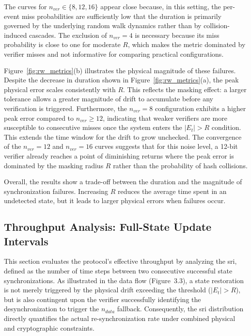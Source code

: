 The curves for $n_{ver} \in \{8, 12, 16\}$ appear close because, in this setting, the per-event miss probabilities are sufficiently low that the duration is primarily governed by the underlying random walk dynamics rather than by collision-induced cascades. The exclusion of $n_{ver}=4$ is necessary because its miss probability is close to one for moderate $R$, which makes the metric dominated by verifier misses and not informative for comparing practical configurations.

Figure~\ref{fig:rw_metrics}(b) illustrates the physical magnitude of these failures. Despite the decrease in duration shown in Figure~\ref{fig:rw_metrics}(a), the peak physical error scales consistently with $R$. This reflects the masking effect: a larger tolerance allows a greater magnitude of drift to accumulate before any verification is triggered. Furthermore, the $n_{ver}=8$ configuration exhibits a higher peak error compared to $n_{ver} \ge 12$, indicating that weaker verifiers are more susceptible to consecutive misses once the system enters the $|E_t| > R$ condition. This extends the time window for the drift to grow unchecked. The convergence of the $n_{ver}=12$ and $n_{ver}=16$ curves suggests that for this noise level, a 12-bit verifier already reaches a point of diminishing returns where the peak error is dominated by the masking radius $R$ rather than the probability of hash collisions.

Overall, the results show a trade-off between the duration and the magnitude of synchronization failures. Increasing $R$ reduces the average time spent in an undetected state, but it leads to larger physical errors when failures occur.


\subsection{Throughput Analysis: Full-State Update Intervals}
\label{subsec:full_update_analysis}

This section evaluates the protocol's effective throughput by analyzing the \gls{sri}, defined as the number of time steps between two consecutive successful state synchronizations. As illustrated in the data flow (Figure~3.3), a state restoration is not merely triggered by the physical drift exceeding the threshold ($|E_t| > R$), but is also contingent upon the verifier successfully identifying the desynchronization to trigger the $n_{data}$ fallback. Consequently, the \gls{sri} distribution directly quantifies the actual re-synchronization rate under combined physical and cryptographic constraints.

